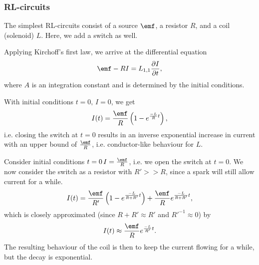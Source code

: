     \subsubsection{RL-circuits}
        The simplest RL-circuits consist of a source $\emf$, a resistor $R$, and a coil (solenoid) $L$.
        Here, we add a switch as well.

        Applying Kirchoff's first law, we arrive at the differential equation
        \begin{equation}
            \emf - RI = L_{1,1}\frac{\partial I}{\partial t},
        \end{equation}
        where $A$ is an integration constant and is determined by the initial conditions.

        With initial conditions $t=0,\, I=0$, we get 
        \begin{equation}
            I(t) = \frac{\emf}{R}\left(1-e^{\frac{-L}{R}t}\right),
        \end{equation}
        i.e. closing the switch at $t=0$ results in an inverse exponential increase in current 
        with an upper bound of $\frac{\emf}{R}$, i.e. conductor-like behaviour for $L$.

        Consider initial conditions $t=0\, I = \frac{\emf}{R}$, i.e. we open the switch at $t=0$.
        We now consider the switch as a resistor with $R' >> R$, since a spark will still allow current for a while.
        \begin{equation}
            I(t) = \frac{\emf}{R'}\left(1-e^{\frac{-L}{R+R'}t}\right) + \frac{\emf}{R} e^{\frac{-L}{R+R'}t},
        \end{equation}
        which is closely approximated (since $R+R' \approx R'$ and $R'^{-1} \approx 0$) by
        \begin{equation}
            I(t) \approx \frac{\emf}{R}e^{\frac{-L}{R'}t}.
        \end{equation}
        The resulting behaviour of the coil is then to keep the current flowing for a while, but the decay is exponential.

